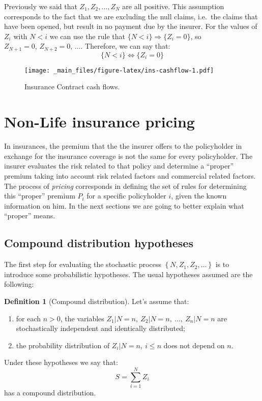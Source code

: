 \documentclass[a4paper, twoside, openright, 12pt]{report}
\providecommand{\tightlist}{%
  \setlength{\itemsep}{0pt}\setlength{\parskip}{0pt}}
\theoremstyle{definition}
\newtheorem{definition}{Definition}[chapter]
\theoremstyle{definition}
\theoremstyle{definition}
\theoremstyle{remark}
\begin{document}
Previously we said that \(Z_1, Z_2, \dots, Z_N\) are all positive. This assumption corresponds to the fact that we are excluding the null claims, i.e.~the claims that have been opened, but result in no payment due by the insurer. For the values of \(Z_i\) with \(N<i\) we can use the rule that \(\{N<i\} \Rightarrow \{Z_i = 0\}\), so \(Z_{N+1}=0, \, Z_{N+2}=0, \, \dots\). Therefore, we can say that:
\[
\{N<i \} \Longleftrightarrow \{Z_i = 0\}
\]

\begin{figure}
\centering
\texttt{[image: \_main\_files/figure-latex/ins-cashflow-1.pdf]}
\caption{\label{fig:ins-cashflow}Insurance Contract cash flows.}
\end{figure}

\hypertarget{non-life-insurance-pricing}{%
\section{Non-Life insurance pricing}\label{non-life-insurance-pricing}}

In insurances, the premium that the the insurer offers to the policyholder in exchange for the insurance coverage is not the same for every policyholder. The insurer evaluates the risk related to that policy and determine a ``proper'' premium taking into account risk related factors and commercial related factors. The process of \emph{pricing} corresponds in defining the set of rules for determining this ``proper'' premium \(P_i\) for a specific policyholder \(i\), given the known information on him. In the next sections we are going to better explain what ``proper'' means.

\hypertarget{compound-distribution-hypotheses}{%
\subsection{Compound distribution hypotheses}\label{compound-distribution-hypotheses}}

The first step for evaluating the stochastic process \(\left\{N, Z_1, Z_2, \dots \right\}\) is to introduce some probabilistic hypotheses. The usual hypotheses assumed are the following:

\begin{definition}[Compound distribution]
\label{def:comp-dist} \iffalse (Compound distribution) \fi{}
Let's assume that:

\begin{enumerate}
\def\labelenumi{\arabic{enumi}.}
\tightlist
\item
  for each \(n>0\), the variables \(Z_1|N=n,\ Z_2|N=n,\ \dots,\ Z_n|N=n\) are stochastically independent and identically distributed;
\item
  the probability distribution of \(Z_i|N=n, \ i\le n\) does not depend on \(n\).
\end{enumerate}

Under these hypotheses we say that:
\[
S = \sum_{i=1}^{N}{Z_i}
\]
has a compound distribution.
\end{definition}
\end{document}
